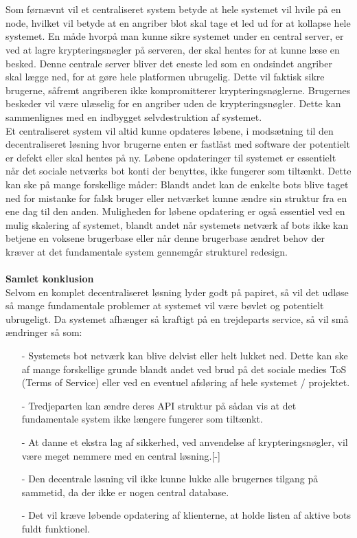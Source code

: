 \\\\
Som førnævnt vil et centraliseret system betyde at hele systemet vil hvile på en node, hvilket vil betyde at en angriber blot skal tage et led ud for at kollapse hele systemet. En måde hvorpå man kunne sikre systemet under en central server, er ved at lagre krypteringsnøgler på serveren, der skal hentes for at kunne læse en besked. Denne centrale server bliver det eneste led som en ondsindet angriber skal lægge ned, for at gøre hele platformen ubrugelig. Dette vil faktisk sikre brugerne, såfremt angriberen ikke kompromitterer krypteringsnøglerne. Brugernes beskeder vil være ulæselig for en angriber uden de krypteringsnøgler. Dette kan sammenlignes med en indbygget selvdestruktion af systemet.\\
Et centraliseret system vil altid kunne opdateres løbene, i modsætning til den decentraliseret løsning hvor brugerne enten er fastlåst med software der potentielt er defekt eller skal hentes på ny. Løbene opdateringer til systemet er essentielt når det sociale netværks bot konti der benyttes, ikke fungerer som tiltænkt. Dette kan ske på mange forskellige måder: Blandt andet kan de enkelte bots blive taget ned for mistanke for falsk bruger eller netværket kunne ændre sin struktur fra en ene dag til den anden. Muligheden for løbene opdatering er også essentiel ved en mulig skalering af systemet, blandt andet når systemets netværk af bots ikke kan betjene en voksene brugerbase eller når denne brugerbase ændret behov der kræver at det fundamentale system gennemgår strukturel redesign.
\\\\
\textbf{Samlet konklusion}\\
Selvom en komplet decentraliseret løsning lyder godt på papiret, så vil det udløse så mange fundamentale problemer at systemet vil være bøvlet og potentielt ubrugeligt. Da systemet afhænger så kraftigt på en trejdeparts service, så vil små ændringer så som:
\begin{itemize}
    \item[-] Systemets bot netværk kan blive delvist eller helt lukket ned. Dette kan ske af mange forskellige grunde blandt andet ved brud på det sociale medies ToS (Terms of Service) eller ved en eventuel afsløring af hele systemet / projektet. 
    \item[-] Tredjeparten kan ændre deres API struktur på sådan vis at det fundamentale system ikke længere fungerer som tiltænkt.
    \item[-] At danne et ekstra lag af sikkerhed, ved anvendelse af krypteringsnøgler, vil være meget nemmere med en central løsning.[-] 
    \item[-] Den decentrale løsning vil ikke kunne lukke alle brugernes tilgang på sammetid, da der ikke er nogen central database.
    \item[-] Det vil kræve løbende opdatering af klienterne, at holde listen af aktive bots fuldt funktionel.
\end{itemize}

